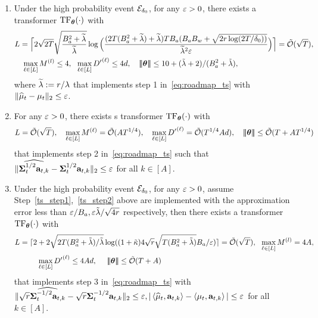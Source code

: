 \begin{enumerate}[label=Step \arabic*,ref= \arabic*]
    \item\label{ts_step1} Under the high probability event ${\mathcal E}_{\delta_0}$, for any $\varepsilon>0$, 
    there exists a transformer ${\rm TF}_{\boldsymbol \theta}(\cdot)$ with 
\begin{align*}&L=\Big\lceil2\sqrt{2T}\sqrt{\frac{B_a^2+\widetilde\lambda}{\widetilde\lambda}}\log\Big(\frac{(2T(B_a^2+\widetilde\lambda)+\widetilde\lambda)TB_a(B_aB_w+\sqrt{2\Tpsparn\log(2T/{\delta_0}))}}{\widetilde\lambda^2\eps}\Big)\Big\rceil=\tcO(\sqrt{T}),\\
&~~~\max_{\ell\in[L]}M^{(l)}\leq4,~~\max_{\ell\in[L]}\hidden^\lth\leq 4d,~~~\nrmp{\btheta}\leq  10+(\tilde\lambda+2)/(B_a^2+\tilde\lambda), \end{align*}
where $\widetilde\lambda:={r}/{\lambda}$
 that implements step 1 in~\eqref{eq:roadmap_ts} with  $\|\widehat{{{\mathbf\mu}}}_t-{{\mathbf\mu}}_t\|_2\leq\varepsilon$.
    \item\label{ts_step2}
    For any $\varepsilon>0$, there exists s transformer ${\rm TF}_{\boldsymbol \theta}(\cdot)$ with     $$L={\tilde{\mathcal O}}(\sqrt{T}),~~~\max_{\ell\in[L]} M^{(\ell)}={\tilde{\mathcal O}}(AT^{1/4}),~~~\max_{\ell\in[L]} {D'}^{(\ell)}={\tilde{\mathcal O}}(T^{1/4}Ad),~~~{\left|\!\left|\!\left|{{\boldsymbol \theta}}\right|\!\right|\!\right|}\leq {\tilde{\mathcal O}}(T+AT^{1/4}) $$
 that implements step 2 in~\eqref{eq:roadmap_ts} such that $\|\widehat{{{\mathbf\Sigma}}_t^{1/2}{\mathbf a}_{t,k}}-{{{\mathbf\Sigma}}_t^{1/2}{\mathbf a}_{t,k}}\|_2\leq \varepsilon$ for all $k\in[A]$.
   \item\label{ts_step3} 
   Under the high probability event ${\mathcal E}_{\delta_0}$, 
   for any $\varepsilon>0$, assume Step~\ref{ts_step1},~\ref{ts_step2} above are implemented with the approximation error less than $\varepsilon/B_a,\varepsilon\tilde\lambda/\sqrt{4{r}}$ respectively, then there exists a transformer ${\rm TF}_{\boldsymbol \theta}(\cdot)$ with 
 \begin{align*}
  &L=\lceil2+2\sqrt{2 T(B_a^2+\tilde\lambda)/\tilde\lambda}\log((1+{\tilde \kappa})4\sqrt{{r}}\sqrt{T(B_a^2+\tilde\lambda)}B_a/\varepsilon)\rceil={\tilde{\mathcal O}}(\sqrt{T}),~~\max_{\ell\in[L]}M^{(l)}=4A,\\
  &~~~\qquad\max_{\ell\in[L]} {D'}^{(\ell)}\leq 4Ad,~~~~ {\left|\!\left|\!\left|{{\boldsymbol \theta}}\right|\!\right|\!\right|}\leq  {\tilde{\mathcal O}}(T+A) 
  \end{align*}
 that implements step 3 in~\eqref{eq:roadmap_ts} with   $\|\sqrt{{r}}\widehat{{{\mathbf\Sigma}}_t^{-1/2}{\mathbf a}_{t,k}}-\sqrt{{r}}{{\mathbf\Sigma}}_t^{-1/2}{\mathbf a}_{t,k}\|_2 \leq\varepsilon,|\left\langle\widehat{{{\mathbf\mu}}}_t,{\mathbf a}_{t,k}\right\rangle-\left\langle{{\mathbf\mu}}_t,{\mathbf a}_{t,k}\right\rangle|\leq\varepsilon$ for all $k\in[A]$. 
 

\end{enumerate}
